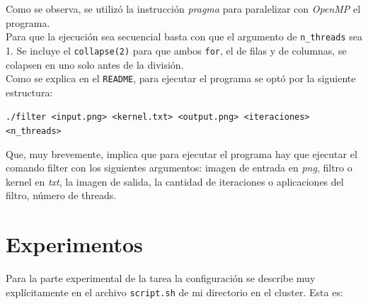 \documentclass[letterpaper,10pt]{article}
\begin{document}
Como se observa, se utilizó la instrucción \textit{pragma} para paralelizar con \textit{OpenMP} el programa.\\

Para que la ejecución sea secuencial basta con que el argumento de \texttt{n\_threads} sea 1. Se incluye el \texttt{collapse(2)} para que ambos \texttt{for}, el de filas y de columnas, se colapsen en uno solo antes de la división.\\

Como se explica en el \texttt{README}, para ejecutar el programa se optó por la siguiente estructura:
\begin{center}
\texttt{./filter <input.png> <kernel.txt> <output.png> <iteraciones> <n\_threads>}
\end{center}

Que, muy brevemente, implica que para ejecutar el programa hay que ejecutar el comando filter con los siguientes argumentos: imagen de entrada en \textit{png}, filtro o kernel en \textit{txt}, la imagen de salida, la cantidad de iteraciones o aplicaciones del filtro, número de threads.


\section{Experimentos}

Para la parte experimental de la tarea la configuración se describe muy explícitamente en el archivo \texttt{script.sh} de mi directorio en el cluster. Esta es:
\end{document}

